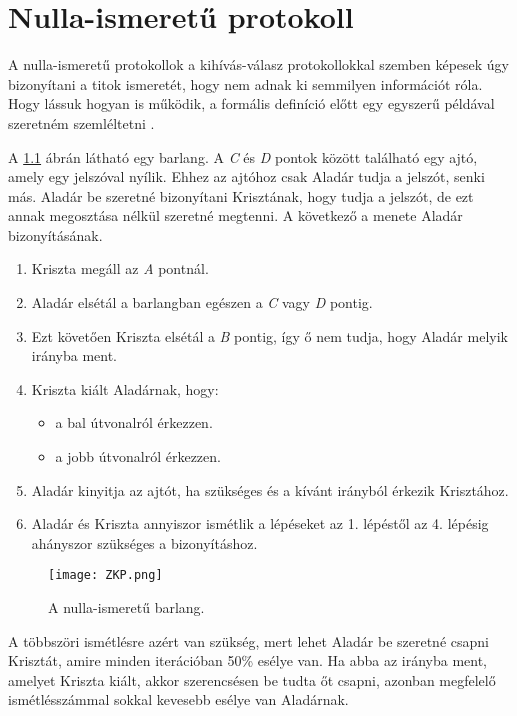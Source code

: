 \chapter{Nulla-ismeretű protokoll}

A nulla-ismeretű protokollok a kihívás-válasz protokollokkal szemben képesek úgy bizonyítani a titok ismeretét, hogy nem adnak ki semmilyen információt róla. Hogy lássuk hogyan is működik, a formális definíció előtt egy egyszerű példával szeretném szemléltetni \cite{ZKPToYourChildren, schneier2015applied}.

A \ref{Figure::ZKcave} ábrán látható egy barlang. A \textit{C} és \textit{D} pontok között található egy ajtó, amely egy jelszóval nyílik. Ehhez az ajtóhoz csak Aladár tudja a jelszót, senki más. Aladár be szeretné bizonyítani Krisztának, hogy tudja a jelszót, de ezt annak megosztása nélkül szeretné megtenni. A következő a menete Aladár bizonyításának.

\begin{enumerate}
    \item Kriszta megáll az \textit{A} pontnál.
    \item Aladár elsétál a barlangban egészen a \textit{C} vagy \textit{D} pontig.
    \item Ezt követően Kriszta elsétál a \textit{B} pontig, így ő nem tudja, hogy Aladár melyik irányba ment.
    \item Kriszta kiált Aladárnak, hogy:
        \begin{itemize}
            \item a bal útvonalról érkezzen.
            \item a jobb útvonalról érkezzen.
        \end{itemize}
    \item Aladár kinyitja az ajtót, ha szükséges és a kívánt irányból érkezik Krisztához.
    \item Aladár és Kriszta annyiszor ismétlik a lépéseket az 1. lépéstől az 4. lépésig ahányszor szükséges a bizonyításhoz.
\end{enumerate}

\begin{figure}[H]
    \centering
    \texttt{[image: ZKP.png]}
    \caption{A nulla-ismeretű barlang.}
    \label{Figure::ZKcave}
\end{figure}

A többszöri ismétlésre azért van szükség, mert lehet Aladár be szeretné csapni Krisztát, amire minden iterációban 50\% esélye van. Ha abba az irányba ment, amelyet Kriszta kiált, akkor szerencsésen be tudta őt csapni, azonban megfelelő ismétlésszámmal sokkal kevesebb esélye van Aladárnak.

